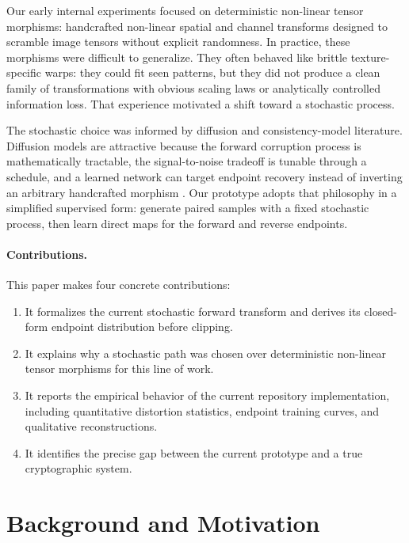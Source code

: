 \documentclass[11pt]{article}
\begin{document}
Our early internal experiments focused on deterministic non-linear tensor morphisms: handcrafted non-linear spatial and channel transforms designed to scramble image tensors without explicit randomness. In practice, these morphisms were difficult to generalize. They often behaved like brittle texture-specific warps: they could fit seen patterns, but they did not produce a clean family of transformations with obvious scaling laws or analytically controlled information loss. That experience motivated a shift toward a stochastic process.

The stochastic choice was informed by diffusion and consistency-model literature. Diffusion models are attractive because the forward corruption process is mathematically tractable, the signal-to-noise tradeoff is tunable through a schedule, and a learned network can target endpoint recovery instead of inverting an arbitrary handcrafted morphism \citep{ho2020ddpm, song2021sde, song2023consistency}. Our prototype adopts that philosophy in a simplified supervised form: generate paired samples with a fixed stochastic process, then learn direct maps for the forward and reverse endpoints.

\paragraph{Contributions.}
This paper makes four concrete contributions:
\begin{enumerate}
    \item It formalizes the current stochastic forward transform and derives its closed-form endpoint distribution before clipping.
    \item It explains why a stochastic path was chosen over deterministic non-linear tensor morphisms for this line of work.
    \item It reports the empirical behavior of the current repository implementation, including quantitative distortion statistics, endpoint training curves, and qualitative reconstructions.
    \item It identifies the precise gap between the current prototype and a true cryptographic system.
\end{enumerate}

\section{Background and Motivation}
\end{document}
